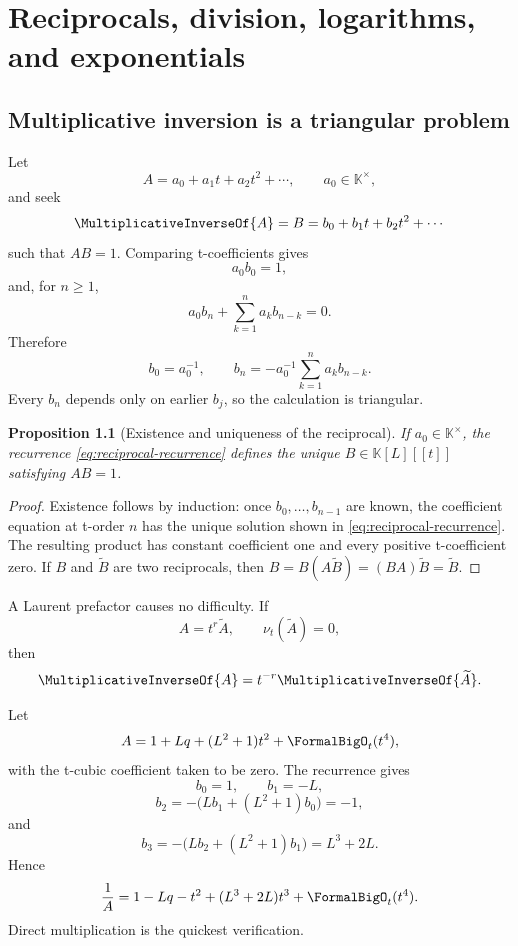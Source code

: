 \documentclass[11pt,openany]{book}
\theoremstyle{definition}
\theoremstyle{plain}
\newtheorem{proposition}{Proposition}[chapter]
\theoremstyle{remark}
\newcommand{\K}{\mathbb{K}}
\newcommand{\val}{\nu}
\newcommand{\recip}[1]{\MultiplicativeInverseOf{#1}}
\begin{document}
\chapter{Reciprocals, division, logarithms, and exponentials}\label{ch:division}

\section{Multiplicative inversion is a triangular problem}
Let
\begin{equation}\label{eq:A-recip-general}
 A=a_0+a_1t+a_2t^2+\cdots,
 \qquad a_0\in\K^\times,
\end{equation}
and seek
\[
 \recip{A}=B=b_0+b_1t+b_2t^2+\cdots
\]
such that \(AB=1\).  Comparing t-coefficients gives
\[
 a_0b_0=1,
\]
and, for \(n\ge1\),
\[
 a_0b_n+\sum_{k=1}^n a_kb_{n-k}=0.
\]
Therefore
\begin{equation}\label{eq:reciprocal-recurrence}
 b_0=a_0^{-1},
 \qquad
 b_n=-a_0^{-1}\sum_{k=1}^n a_kb_{n-k}.
\end{equation}
Every \(b_n\) depends only on earlier \(b_j\), so the calculation is
triangular.

\begin{proposition}[Existence and uniqueness of the reciprocal]\label{prop:reciprocal}
If \(a_0\in\K^\times\), the recurrence \eqref{eq:reciprocal-recurrence}
defines the unique \(B\in\K[L][[t]]\) satisfying \(AB=1\).
\end{proposition}
\begin{proof}
Existence follows by induction: once \(b_0,\ldots,b_{n-1}\) are known, the
coefficient equation at t-order \(n\) has the unique solution shown in
\cref{eq:reciprocal-recurrence}.  The resulting product has constant
coefficient one and every positive t-coefficient zero.  If \(B\) and
\(\widetilde B\) are two reciprocals, then
\(B=B(A\widetilde B)=(BA)\widetilde B=\widetilde B\).
\end{proof}

A Laurent prefactor causes no difficulty.  If
\[
 A=t^r\widetilde A,
 \qquad \val_t(\widetilde A)=0,
\]
then
\[
 \recip{A}=t^{-r}\recip{\widetilde A}.
\]

\begin{workedbox}
Let
\[
 A=1+Lq+(L^2+1)t^2+\FormalBigO_t(t^4),
\]
with the t-cubic coefficient taken to be zero.  The recurrence gives
\[
 b_0=1,
 \qquad b_1=-L,
\]
\[
 b_2=-\bigl(Lb_1+(L^2+1)b_0\bigr)=-1,
\]
and
\[
 b_3=-\bigl(Lb_2+(L^2+1)b_1\bigr)=L^3+2L.
\]
Hence
\[
 \frac1A=1-Lq-t^2+(L^3+2L)t^3+\FormalBigO_t(t^4).
\]
Direct multiplication is the quickest verification.
\end{workedbox}
\end{document}
